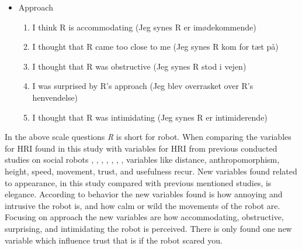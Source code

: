 \begin{itemize}
\begin{enumerate}
\end{enumerate}
\item Approach 
\begin{enumerate}
  \item I think R is accommodating (Jeg synes R er imødekommende)
  \item I thought that R came too close to me (Jeg synes R kom for tæt på)
  \item I thought that R was obstructive (Jeg synes R stod i vejen)
  \item I was surprised by R's approach (Jeg blev overrasket over R's henvendelse)
  \item I thought that R was intimidating (Jeg synes R er intimiderende)
\end{enumerate}
\end{itemize}
%
In the above scale questions \textit{R} is short for robot. When comparing the variables for HRI found in this study with variables for HRI from previous conducted studies on social robots \cite{PDF:ExploringInfluencingVariable}, \cite{PDF:SharingALifeHarvey}, \cite{PDF:InTheCompanyofRobots}, \cite{PDF:CloseButNotStuck}, \cite{PDF:TheImpactOfTraveler}, \cite{PDF:HumanRobotEmodiedInteraction}, \cite{PDF:RecommendationEffects}, variables like distance, anthropomorphism, height, speed, movement, trust, and usefulness recur. New variables found related to appearance, in this study compared with previous mentioned studies, is elegance. According to behavior the new variables found is how annoying and intrusive the robot is, and how calm or wild the movements of the robot are. Focusing on approach the new variables are how accommodating, obstructive, surprising, and intimidating the robot is perceived. There is only found one new variable which influence trust that is if the robot scared you. 

